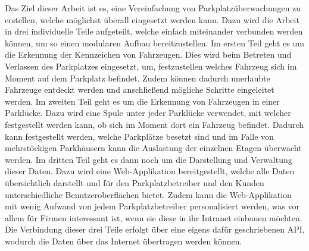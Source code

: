 Das Ziel dieser Arbeit ist es, eine Vereinfachung von Parkplatzüberwachungen zu
erstellen, welche möglichst überall eingesetzt werden kann. Dazu wird die Arbeit
in drei individuelle Teile aufgeteilt, welche einfach miteinander verbunden
werden können, um so einen modularen Aufbau bereitzustellen. Im ersten Teil geht
es um die Erkennung der Kennzeichen von Fahrzeugen. Dies wird beim Betreten und
Verlassen des Parkplatzes eingesetzt, um, festzustellen welches Fahrzeug sich im
Moment auf dem Parkplatz befindet. Zudem können dadurch unerlaubte Fahrzeuge
entdeckt werden und anschließend mögliche Schritte eingeleitet werden. Im
zweiten Teil geht es um die Erkennung von Fahrzeugen in einer Parklücke. Dazu
wird eine Spule unter jeder Parklücke verwendet, mit welcher festgestellt werden
kann, ob sich im Moment dort ein Fahrzeug befindet. Dadurch kann festgestellt
werden, welche Parkplätze besetzt sind und im Falle von mehrstöckigen Parkhäusern
kann die Auslastung der einzelnen Etagen überwacht werden. Im dritten Teil geht
es dann noch um die Darstellung und Verwaltung dieser Daten. Dazu wird eine
Web-Applikation bereitgestellt, welche alle Daten übersichtlich darstellt und
für den Parkplatzbetreiber und den Kunden unterschiedliche Benutzeroberflächen
bietet. Zudem kann die Web-Applikation mit wenig Aufwand von jedem
Parkplatzbetreiber personalisiert werden, was vor allem für Firmen interessant
ist, wenn sie diese in ihr Intranet einbauen möchten. Die Verbindung dieser drei
Teile erfolgt über eine eigens dafür geschriebenen API, wodurch die Daten über
das Internet übertragen werden können.